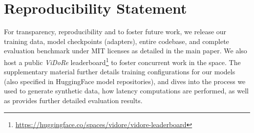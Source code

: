 \documentclass{article} %
\begin{document}






\section*{Reproducibility Statement}

For transparency, reproducibility and to foster future work, we release our training data, model checkpoints (adapters), entire codebase, and complete evaluation benchmark under MIT licenses as detailed in the main paper. We also host a public \textit{ViDoRe} leaderboard\footnote{\url{https://huggingface.co/spaces/vidore/vidore-leaderboard}} to foster concurrent work in the space. The supplementary material further details training configurations for our models (also specified in HuggingFace model repositories), and dives into the process we used to generate synthetic data, how latency computations are performed, as well as provides further detailed evaluation results.
\end{document}
